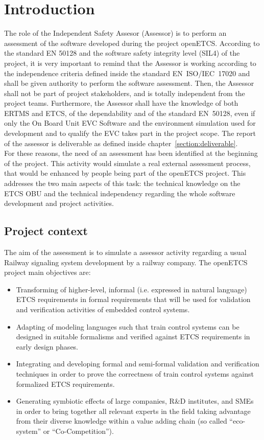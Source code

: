 \documentclass[openetcs]{template/openetcs_article}
\begin{document}
\section{Introduction}
The role of the Independent Safety Assesor (Assessor) is to perform an assessment of the software developed during the project openETCS. According to the standard EN 50128 and the software
safety integrity level (SIL4) of the project, it is very important to remind that the Assessor is working according to the independence criteria defined inside the standard EN~ISO/IEC~17020 \cite{EN17020} and shall be given
authority to perform the software assessment. Then, the Assessor shall not be part of project stakeholders, and is totally independent from the project teams.
Furthermore, the Assessor shall have the knowledge of both ERTMS and ETCS, of the dependability and of the standard EN~50128, even if only the On Board Unit EVC Software and the environment simulation used for development and to qualify the EVC takes part in the project scope. The report of the assessor is deliverable as defined inside chapter~\ref{section:deliverable}.
\\
For these reasons, the need of an assessment has been identified at the beginning of the project. This activity would simulate a real external
assessment process, that would be enhanced by people being part of the openETCS project. This addresses the two main aspects of this task:
the technical knowledge on the ETCS OBU and the technical independency regarding the whole software development and project activities.

\subsection{Project context}
The aim of the assessment is to simulate a assessor activity regarding a usual Railway signaling system development by a railway company. The openETCS project main objectives are:
\begin{itemize}
\item Transforming of higher-level, informal (i.e. expressed in natural language) ETCS requirements in formal requirements that will be used for
validation and verification activities of embedded control systems.
\item Adapting of modeling languages such that train control systems can be designed in suitable formalisms and verified against ETCS requirements in early
design phases.
\item Integrating and developing formal and semi-formal validation and verification techniques in order to prove the correctness of train control systems
against formalized ETCS requirements.
\item Generating symbiotic effects of large companies, R\&D institutes, and SMEs in order to bring together all relevant experts in the field taking advantage
from their diverse knowledge within a value adding chain (so called “eco-system” or “Co-Competition”).
\end{itemize}
\end{document}
